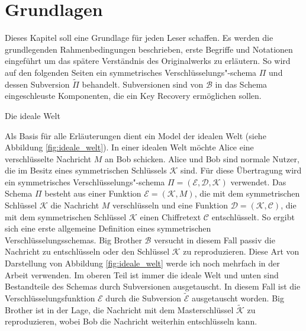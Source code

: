 \chapter{Grundlagen}
\label{ch:Grundlagen}

Dieses Kapitel soll eine Grundlage für jeden Leser schaffen. Es werden die grundlegenden Rahmenbedingungen beschrieben, erste Begriffe und Notationen eingeführt um das spätere Verständnis des Originalwerks zu erläutern. So wird auf den folgenden Seiten ein symmetrisches Verschlüsselungs"-schema $\Pi$ und dessen Subversion $\widetilde{\Pi}$ behandelt. Subversionen sind von $\mathscr{B}$ in das Schema eingeschleuste Komponenten, die ein Key Recovery ermöglichen sollen.

\begin{section}{Die ideale Welt}
\label{sec:ideale_welt}

Als Basis für alle Erläuterungen dient ein Model der idealen Welt (siehe Abbildung \ref{fig:ideale_welt}). In einer idealen Welt möchte Alice eine verschlüsselte Nachricht $M$ an Bob schicken. Alice und Bob sind normale Nutzer, die im Besitz eines symmetrischen Schlüssels $\mathcal{K}$ sind. Für diese Übertragung wird ein symmetrisches Verschlüsselungs"-schema $\Pi = (\mathcal{E}, \mathcal{D}, \mathcal{K})$ verwendet. Das Schema $\Pi$ besteht aus einer Funktion $\mathcal{E} = (\mathcal{K}, M)$, die mit dem symmetrischen Schlüssel $\mathcal{K}$ die Nachricht $M$ verschlüsseln und eine Funktion $\mathcal{D} = (\mathcal{K}, \mathcal{C})$, die mit dem symmetrischen Schlüssel $\mathcal{K}$ einen Chiffretext $\mathcal{C}$ entschlüsselt. So ergibt sich eine erste allgemeine Definition eines symmetrischen Verschlüsselungsschemas. Big Brother $\mathscr{B}$ versucht in diesem Fall passiv die Nachricht zu entschlüsseln oder den Schlüssel $\mathcal{K}$ zu reproduzieren. Diese Art von Darstellung von Abbildung \ref{fig:ideale_welt} werde ich noch mehrfach in der Arbeit verwenden. Im oberen Teil ist immer die ideale Welt und unten sind Bestandteile des Schemas durch Subversionen ausgetauscht. In diesem Fall ist die Verschlüsselungsfunktion $\mathcal{E}$ durch die Subversion $\widetilde{\mathcal{E}}$ ausgetauscht worden. Big Brother ist in der Lage, die Nachricht mit dem Masterschlüssel $\widetilde{\mathcal{K}}$ zu reproduzieren, wobei Bob die Nachricht weiterhin entschlüsseln kann.


\end{section}
